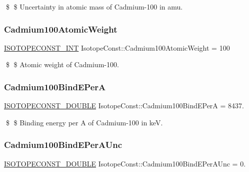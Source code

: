 \$ \$ Uncertainty in atomic mass of Cadmium-\/100 in amu. \mbox{\label{group___isotope_const-_cadmium-_cd100_gac3bf13d19598dd494f5436a69ea2a501}} 
\subsubsection{\texorpdfstring{Cadmium100\+Atomic\+Weight}{Cadmium100AtomicWeight}}
{\footnotesize\ttfamily \mbox{\hyperlink{group___isotope_const-_macros_ga5f18360b3e99483a35c32d789e62621c}{I\+S\+O\+T\+O\+P\+E\+C\+O\+N\+S\+T\+\_\+\+I\+NT}} Isotope\+Const\+::\+Cadmium100\+Atomic\+Weight = 100}

\$ \$ Atomic weight of Cadmium-\/100. \mbox{\label{group___isotope_const-_cadmium-_cd100_gab692994ee308c223ca56465400955f73}} 
\subsubsection{\texorpdfstring{Cadmium100\+Bind\+E\+PerA}{Cadmium100BindEPerA}}
{\footnotesize\ttfamily \mbox{\hyperlink{group___isotope_const-_macros_ga8f45a7272ce02c0b4c65c44636ed719a}{I\+S\+O\+T\+O\+P\+E\+C\+O\+N\+S\+T\+\_\+\+D\+O\+U\+B\+LE}} Isotope\+Const\+::\+Cadmium100\+Bind\+E\+PerA = 8437.}

\$ \$ Binding energy per A of Cadmium-\/100 in keV. \mbox{\label{group___isotope_const-_cadmium-_cd100_gafeefd9225a65fc12e2b82108741a6920}} 
\subsubsection{\texorpdfstring{Cadmium100\+Bind\+E\+Per\+A\+Unc}{Cadmium100BindEPerAUnc}}
{\footnotesize\ttfamily \mbox{\hyperlink{group___isotope_const-_macros_ga8f45a7272ce02c0b4c65c44636ed719a}{I\+S\+O\+T\+O\+P\+E\+C\+O\+N\+S\+T\+\_\+\+D\+O\+U\+B\+LE}} Isotope\+Const\+::\+Cadmium100\+Bind\+E\+Per\+A\+Unc = 0.}

